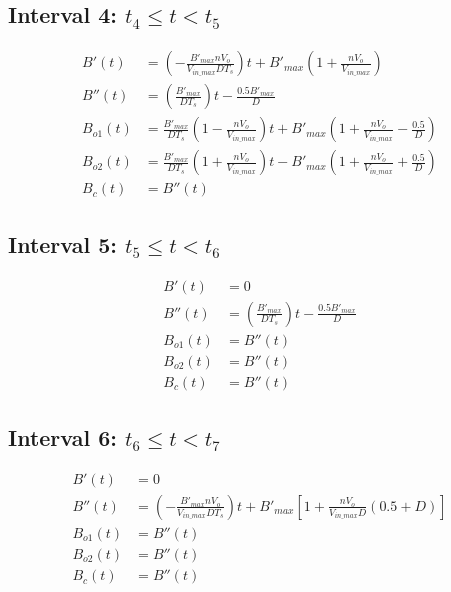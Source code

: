\documentclass{article}
\begin{document}
\subsection*{Interval 4: $t_4 \le t < t_5$}
\begin{align}
    B'(t) &= \left( - \frac{B'_{max} n V_o}{V_{in\_max} D T_s} \right) t + B'_{max} \left( 1 + \frac{n V_o}{V_{in\_max}} \right) \\
    B''(t) &= \left( \frac{B'_{max}}{D T_s} \right) t - \frac{0.5 B'_{max}}{D} \\
    B_{o1}(t) &= \frac{B'_{max}}{D T_s} \left( 1 - \frac{n V_o}{V_{in\_max}} \right) t + B'_{max} \left( 1 + \frac{n V_o}{V_{in\_max}} - \frac{0.5}{D} \right) \\
    B_{o2}(t) &= \frac{B'_{max}}{D T_s} \left( 1 + \frac{n V_o}{V_{in\_max}} \right) t - B'_{max} \left( 1 + \frac{n V_o}{V_{in\_max}} + \frac{0.5}{D} \right) \\
    B_c(t) &= B''(t)
\end{align}

\subsection*{Interval 5: $t_5 \le t < t_6$}
\begin{align}
    B'(t) &= 0 \\
    B''(t) &= \left( \frac{B'_{max}}{D T_s} \right) t - \frac{0.5 B'_{max}}{D} \\
    B_{o1}(t) &= B''(t) \\
    B_{o2}(t) &= B''(t) \\
    B_c(t) &= B''(t)
\end{align}

\subsection*{Interval 6: $t_6 \le t < t_7$}
\begin{align}
    B'(t) &= 0 \\
    B''(t) &= \left( - \frac{B'_{max} n V_o}{V_{in\_max} D T_s} \right) t + B'_{max} \left[ 1 + \frac{n V_o}{V_{in\_max} D} (0.5 + D) \right] \\
    B_{o1}(t) &= B''(t) \\
    B_{o2}(t) &= B''(t) \\
    B_c(t) &= B''(t)
\end{align}
\end{document}
